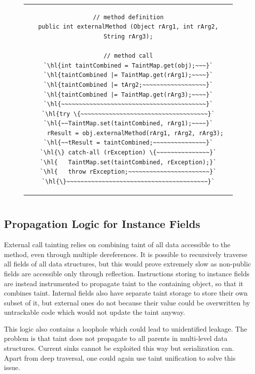 \documentclass[12pt,twoside,notitlepage]{report}
\begin{document}
\begin{figure}
	\centering
	\begin{tabular}{c}
	\begin{lstlisting}
// method definition
public int externalMethod (Object rArg1, int rArg2, String rArg3);

// method call
`\hl{int taintCombined = TaintMap.get(obj);~~~}`
`\hl{taintCombined |= TaintMap.get(rArg1);~~~~}`
`\hl{taintCombined |= tArg2;~~~~~~~~~~~~~~~~~~}`
`\hl{taintCombined |= TaintMap.get(rArg3);~~~~}`
`\hl{~~~~~~~~~~~~~~~~~~~~~~~~~~~~~~~~~~~~~~~~~}`
`\hl{try \{~~~~~~~~~~~~~~~~~~~~~~~~~~~~~~~~~~~~}`
`\hl{~~TaintMap.set(taintCombined, rArg1);~~~~}`
	rResult = obj.externalMethod(rArg1, rArg2, rArg3);
`\hl{~~tResult = taintCombined;~~~~~~~~~~~~~~~}`
`\hl{\} catch-all (rException) \{~~~~~~~~~~~~~~~}`
`\hl{	TaintMap.set(taintCombined, rException);}`
`\hl{	throw rException;~~~~~~~~~~~~~~~~~~~~~~~}`
`\hl{\}~~~~~~~~~~~~~~~~~~~~~~~~~~~~~~~~~~~~~~~~}`
	\end{lstlisting}
	\end{tabular}
	\begin{lstlisting}[caption={Instrumentation of external method calls. The second and third arguments do not inherit combined taint because they are immutable.},
	                   label={listing:TaintPropagation_ExternalMethodCall}]
	\end{lstlisting}
\end{figure}

\subsection{Propagation Logic for Instance Fields}

External call tainting relies on combining taint of all data accessible to the method, even through multiple dereferences. It is possible to recursively traverse all fields of all data structures, but this would prove extremely slow as non-public fields are accessible only through reflection. Instructions storing to instance fields are instead instrumented to propagate taint to the containing object, so that it combines taint. Internal fields also have separate taint storage to store their own subset of it, but external ones do not because their value could be overwritten by untrackable code which would not update the taint anyway.

This logic also contains a loophole which could lead to unidentified leakage. The problem is that taint does not propagate to all parents in multi-level data structures. Current sinks cannot be exploited this way but serialization can. Apart from deep traversal, one could again use taint unification to solve this issue.
\end{document}

